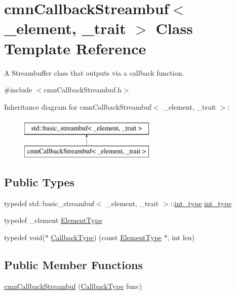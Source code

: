 \hypertarget{classcmn_callback_streambuf}{}\section{cmn\+Callback\+Streambuf$<$ \+\_\+element, \+\_\+trait $>$ Class Template Reference}
\label{classcmn_callback_streambuf}


A Streambuffer class that outputs via a callback function.  




{\ttfamily \#include $<$cmn\+Callback\+Streambuf.\+h$>$}

Inheritance diagram for cmn\+Callback\+Streambuf$<$ \+\_\+element, \+\_\+trait $>$\+:\begin{figure}[H]
\begin{center}
\leavevmode
\includegraphics[height=2.000000cm]{d6/df3/classcmn_callback_streambuf}
\end{center}
\end{figure}
\subsection*{Public Types}
\begin{DoxyCompactItemize}
\item 
typedef std\+::basic\+\_\+streambuf$<$ \+\_\+element, \+\_\+trait $>$\+::\hyperlink{classcmn_callback_streambuf_a9599d576e1867902844cb4b5bf3150e8}{int\+\_\+type} \hyperlink{classcmn_callback_streambuf_a9599d576e1867902844cb4b5bf3150e8}{int\+\_\+type}
\item 
typedef \+\_\+element \hyperlink{classcmn_callback_streambuf_a3f220172226bbffc7cebefa8d458823a}{Element\+Type}
\item 
typedef void($\ast$ \hyperlink{classcmn_callback_streambuf_a606588225b2f37857213d2f3181119dd}{Callback\+Type}) (const \hyperlink{classcmn_callback_streambuf_a3f220172226bbffc7cebefa8d458823a}{Element\+Type} $\ast$, int len)
\end{DoxyCompactItemize}
\subsection*{Public Member Functions}
\begin{DoxyCompactItemize}
\item 
\hyperlink{classcmn_callback_streambuf_a09f93d86b52f31efb0387a7041f2ac6b}{cmn\+Callback\+Streambuf} (\hyperlink{classcmn_callback_streambuf_a606588225b2f37857213d2f3181119dd}{Callback\+Type} func)
\end{DoxyCompactItemize}
